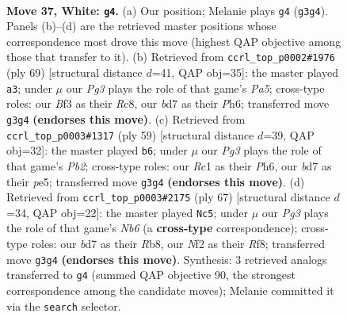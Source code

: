\documentclass[11pt]{article}
\begin{document}
\clearpage

\begin{figure}[p]\centering
\begin{subfigure}{0.46\textwidth}\centering
\resizebox{\linewidth}{!}{%
\newchessgame
\chessboard[
  setfen={3r1k2/1p1b1p1p/8/p2p2r1/8/1P1K1BP1/P4N1P/2R3R1 w - - 1 37},
  showmover=false,
  pgfstyle=straightmove, color=movearrow, markmove={g3-g4}
]}
\caption{}
\end{subfigure}\hfill
\begin{subfigure}{0.46\textwidth}\centering
\resizebox{\linewidth}{!}{%
\newchessgame
\chessboard[
  setfen={r1r4k/5pp1/7p/3R3P/p7/2P2P2/1P3P2/R5K1 b - - 2 35},
  showmover=false,
  pgfstyle=straightmove, color=movearrow, markmove={a4-a3}
]}
\caption{}
\end{subfigure}
\\[4pt]
\begin{subfigure}{0.46\textwidth}\centering
\resizebox{\linewidth}{!}{%
\newchessgame
\chessboard[
  setfen={8/Rp1rk3/2p1p2p/4P1pP/Pn2B3/6P1/1r3P2/4R1K1 b - - 2 30},
  showmover=false,
  pgfstyle=straightmove, color=movearrow, markmove={b7-b6}
]}
\caption{}
\end{subfigure}\hfill
\begin{subfigure}{0.46\textwidth}\centering
\resizebox{\linewidth}{!}{%
\newchessgame
\chessboard[
  setfen={1r3r2/2R5/2Pp1kp1/5p2/P3p3/1n4PB/4PP2/1R4K1 b - - 0 34},
  showmover=false,
  pgfstyle=straightmove, color=movearrow, markmove={b3-c5}
]}
\caption{}
\end{subfigure}
\caption{\textbf{Move 37, White: \texttt{g4}.} (a) Our position; Melanie plays \texttt{g4} (\texttt{g3g4}). Panels (b)--(d) are the retrieved master positions whose correspondence most drove this move (highest QAP objective among those that transfer to it). (b) Retrieved from \texttt{ccrl\_top\_p0002\#1976} (ply 69) [structural distance $d$=41, QAP obj=35]: the master played \texttt{a3}; under $\mu$ our \emph{Pg3} plays the role of that game's \emph{Pa5}; cross-type roles: our \emph{B}f3 as their \emph{R}c8, our \emph{b}d7 as their \emph{P}h6; transferred move \texttt{g3g4} \textbf{(endorses this move)}. (c) Retrieved from \texttt{ccrl\_top\_p0003\#1317} (ply 59) [structural distance $d$=39, QAP obj=32]: the master played \texttt{b6}; under $\mu$ our \emph{Pg3} plays the role of that game's \emph{Pb2}; cross-type roles: our \emph{R}c1 as their \emph{P}h6, our \emph{b}d7 as their \emph{p}e5; transferred move \texttt{g3g4} \textbf{(endorses this move)}. (d) Retrieved from \texttt{ccrl\_top\_p0003\#2175} (ply 67) [structural distance $d$=34, QAP obj=22]: the master played \texttt{Nc5}; under $\mu$ our \emph{Pg3} plays the role of that game's \emph{Nb6} (a \textbf{cross-type} correspondence); cross-type roles: our \emph{b}d7 as their \emph{R}b8, our \emph{N}f2 as their \emph{R}f8; transferred move \texttt{g3g4} \textbf{(endorses this move)}. Synthesis: 3 retrieved analogs transferred to \texttt{g4} (summed QAP objective 90, the strongest correspondence among the candidate moves); Melanie committed it via the \texttt{search} selector.}
\label{fig:thought-m72}
\end{figure}
\end{document}

